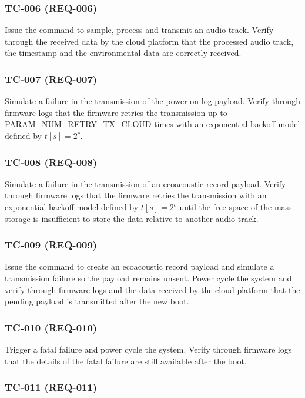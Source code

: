 \documentclass[11pt,a4paper]{article}
\begin{document}
\subsubsection{TC-006 (REQ-006)}

Issue the command to sample, process and transmit an audio track. Verify through
the received data by the cloud platform that the processed audio track,
the timestamp and the environmental data are correctly received.

\subsubsection{TC-007 (REQ-007)}

Simulate a failure in the transmission of the power-on log payload. Verify
through firmware logs that the firmware retries the transmission up to
PARAM\_NUM\_RETRY\_TX\_CLOUD times with an exponential backoff model defined by
$t[s]=2^c$.

\subsubsection{TC-008 (REQ-008)}

Simulate a failure in the transmission of an ecoacoustic record payload. Verify
through firmware logs that the firmware retries the transmission with an
exponential backoff model defined by $t[s]=2^c$ until the free space of the mass
storage is insufficient to store the data relative to another audio track.

\subsubsection{TC-009 (REQ-009)}

Issue the command to create an ecoacoustic record payload and simulate a
transmission failure so the payload remains unsent. Power cycle the system and
verify through firmware logs and the data received by the cloud platform that
the pending payload is transmitted after the new boot.

\subsubsection{TC-010 (REQ-010)}

Trigger a fatal failure and power cycle the system. Verify through firmware logs
that the details of the fatal failure are still available after the boot.

\subsubsection{TC-011 (REQ-011)}
\end{document}
